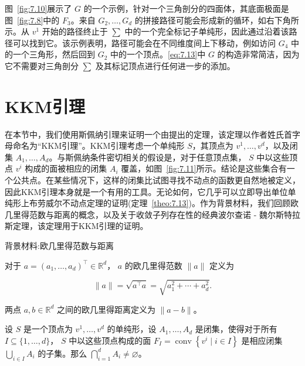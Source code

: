 图~\ref{fig:7.10}展示了 \(G\) 的一个示例，针对一个三角剖分的四面体，其底面极面是图~\ref{fig:7.8}中的 \({F}_{3}\)。来自 \({G}_{2},\ldots,{G}_{d}\) 的拼接路径可能会形成新的循环，如右下角所示。从 \({v}^{1}\) 开始的路径终止于 \(\sum\) 中的一个完全标记子单纯形，因此通过沿着该路径可以找到它。该示例表明，路径可能会在不同维度间上下移动，例如访问 \({G}_{4}\) 中的一个三角形，然后回到 \({G}_{2}\) 中的一个顶点。\eqref{eq:7.13}中 \(G\) 的构造非常简洁，因为它不需要对三角剖分 \(\sum\) 及其标记顶点进行任何进一步的添加。

\section{KKM引理}\label{sec-7.5}

在本节中，我们使用斯佩纳引理来证明一个由\citet*{knaster1929}提出的定理，该定理以作者姓氏首字母命名为“KKM引理”。KKM引理考虑一个单纯形 \(S\)，其顶点为 \({v}^{1},\ldots,{v}^{d}\)，以及闭集 \({A}_{1},\ldots,{A}_{d}\)。与斯佩纳条件密切相关的假设是，对于任意顶点集， \(S\) 中以这些顶点 \({v}^{i}\) 构成的面被相应的闭集 \({A}_{i}\) 覆盖，如图~\ref{fig:7.11}所示。结论是这些集合有一个公共点。在某些情况下，这样的闭集比试图寻找不动点的函数更自然地被定义，因此KKM引理本身就是一个有用的工具。无论如何，它几乎可以立即导出单位单纯形上布劳威尔不动点定理的证明(定理~\ref{theo:7.13})。作为背景材料，我们回顾欧几里得范数与距离的概念，以及关于收敛子列存在性的经典波尔查诺 - 魏尔斯特拉斯定理，该定理用于KKM引理的证明。

背景材料:欧几里得范数与距离

对于 \(a = {\left( {a}_{1},\ldots,{a}_{d}\right) }^{\top } \in  {\mathbb{R}}^{d}\)， \(a\) 的欧几里得范数 \(\parallel a\parallel\) 定义为

\[
\parallel a\parallel  = \sqrt{{a}^{\top }a} = \sqrt{{a}_{1}^{2} + \cdots  + {a}_{d}^{2}}.
\]

两点 \(a,b \in  {\mathbb{R}}^{d}\) 之间的欧几里得距离定义为 \(\parallel a - b\parallel\)。

\bigskip
\noindent
\begin{theorem}[KKM引理]\label{theo:7.12}
设 \(S\) 是一个顶点为 \({v}^{1},\ldots,{v}^{d}\) 的单纯形，设 \({A}_{1},\ldots,{A}_{d}\) 是闭集，使得对于所有 \(I \subseteq  \{ 1,\ldots,d\}\)， \(S\) 中以这些顶点构成的面 \({F}_{I} = \operatorname{conv}\left\{  {{v}^{i} \mid  i \in  I}\right\}\) 是相应闭集 \(\mathop{\bigcup }\limits_{{i \in  I}}{A}_{i}\) 的子集。那么 \(\mathop{\bigcap }\limits_{{i = 1}}^{d}{A}_{i} \neq  \varnothing\)。
\end{theorem}

